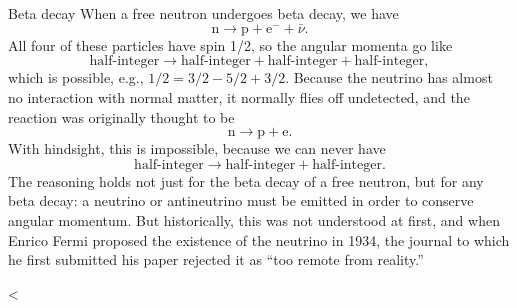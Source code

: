 \begin{eg}{Beta decay}
When a free neutron undergoes beta decay, we have
\begin{equation*}
  \text{n} \rightarrow \text{p}+\text{e}^-+\bar{\nu}.
\end{equation*}
All four of these particles have spin 1/2, so the angular momenta go like
\begin{equation*}
  \text{half-integer} \rightarrow \text{half-integer}+\text{half-integer}+\text{half-integer},
\end{equation*}
which is possible, e.g., $1/2=3/2-5/2+3/2$. Because the neutrino has almost no interaction with
normal matter, it normally flies off undetected, and the reaction was originally thought to be
\begin{equation*}
  \text{n} \rightarrow \text{p}+\text{e}.
\end{equation*}
With hindsight, this is impossible, because we can never have
\begin{equation*}
  \text{half-integer} \rightarrow \text{half-integer}+\text{half-integer}.
\end{equation*}
The reasoning holds not just for the beta decay of a free neutron, but for any beta decay: a neutrino or antineutrino
must be emitted in order to conserve angular momentum.
But historically, this was not understood at first, and when Enrico Fermi proposed the
existence of the neutrino in 1934, the journal to which he first submitted his paper
rejected it as ``too remote from reality.''
\end{eg}

<%
